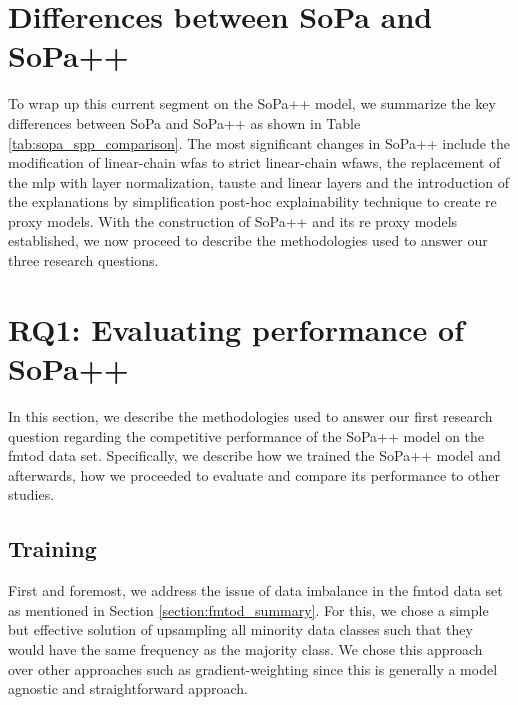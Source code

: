 \section{Differences between SoPa and SoPa++}

To wrap up this current segment on the SoPa++ model, we summarize the key
differences between SoPa and SoPa++ as shown in Table
\ref{tab:sopa_spp_comparison}. The most significant changes in SoPa++
include the modification of linear-chain \ac{wfas} to strict linear-chain
\ac{wfaws}, the replacement of the \ac{mlp} with layer normalization, \ac{tauste} and
linear layers and the introduction of the explanations by simplification
post-hoc explainability technique to create \ac{re} proxy models. With the
construction of SoPa++ and its \ac{re} proxy models established, we now proceed to
describe the methodologies used to answer our three research questions.

\section{RQ1: Evaluating performance of SoPa++}

In this section, we describe the methodologies used to answer our first research
question regarding the competitive performance of the SoPa++ model on the \ac{fmtod}
data set. Specifically, we describe how we trained the SoPa++ model and
afterwards, how we proceeded to evaluate and compare its performance to other
studies.

\subsection{Training}

\label{section:spp_training}

First and foremost, we address the issue of data imbalance in the \ac{fmtod} data set
as mentioned in Section \ref{section:fmtod_summary}. For this, we chose a simple
but effective solution of upsampling all minority data classes such that they
would have the same frequency as the majority class. We chose this approach over
other approaches such as gradient-weighting since this is generally a model
agnostic and straightforward approach.

